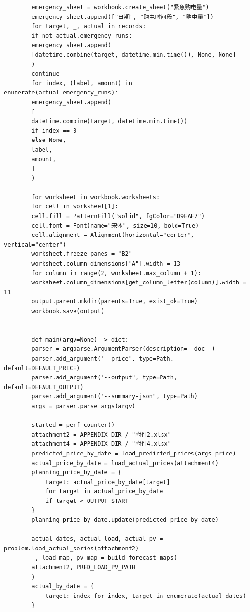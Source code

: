 \documentclass[UTF8]{ctexart}
\begin{document}
\begin{verbatim}
        emergency_sheet = workbook.create_sheet("紧急购电量")
        emergency_sheet.append(["日期", "购电时间段", "购电量"])
        for target, _, actual in records:
        if not actual.emergency_runs:
        emergency_sheet.append(
        [datetime.combine(target, datetime.min.time()), None, None]
        )
        continue
        for index, (label, amount) in enumerate(actual.emergency_runs):
        emergency_sheet.append(
        [
        datetime.combine(target, datetime.min.time())
        if index == 0
        else None,
        label,
        amount,
        ]
        )
        
        for worksheet in workbook.worksheets:
        for cell in worksheet[1]:
        cell.fill = PatternFill("solid", fgColor="D9EAF7")
        cell.font = Font(name="宋体", size=10, bold=True)
        cell.alignment = Alignment(horizontal="center", vertical="center")
        worksheet.freeze_panes = "B2"
        worksheet.column_dimensions["A"].width = 13
        for column in range(2, worksheet.max_column + 1):
        worksheet.column_dimensions[get_column_letter(column)].width = 11
        output.parent.mkdir(parents=True, exist_ok=True)
        workbook.save(output)
        
        
        def main(argv=None) -> dict:
        parser = argparse.ArgumentParser(description=__doc__)
        parser.add_argument("--price", type=Path, default=DEFAULT_PRICE)
        parser.add_argument("--output", type=Path, default=DEFAULT_OUTPUT)
        parser.add_argument("--summary-json", type=Path)
        args = parser.parse_args(argv)
        
        started = perf_counter()
        attachment2 = APPENDIX_DIR / "附件2.xlsx"
        attachment4 = APPENDIX_DIR / "附件4.xlsx"
        predicted_price_by_date = load_predicted_prices(args.price)
        actual_price_by_date = load_actual_prices(attachment4)
        planning_price_by_date = {
            target: actual_price_by_date[target]
            for target in actual_price_by_date
            if target < OUTPUT_START
        }
        planning_price_by_date.update(predicted_price_by_date)
        
        actual_dates, actual_load, actual_pv = problem.load_actual_series(attachment2)
        _, load_map, pv_map = build_forecast_maps(
        attachment2, PRED_LOAD_PV_PATH
        )
        actual_by_date = {
            target: index for index, target in enumerate(actual_dates)
        }
        

\end{verbatim}
\end{document}
